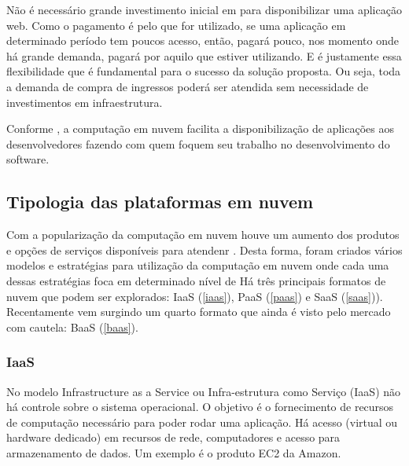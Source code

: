 Não é necessário grande investimento inicial em para disponibilizar uma aplicação web.
Como o pagamento é pelo que for utilizado, se uma aplicação em determinado período tem
poucos acesso, então, pagará pouco, nos momento onde há grande demanda, pagará por aquilo
que estiver utilizando. E é justamente essa flexibilidade que é fundamental para o sucesso
da solução proposta. Ou seja, toda a demanda de compra de ingressos poderá ser atendida
sem necessidade de investimentos em infraestrutura.

Conforme \cite{types-of-cloud-computing}, a computação em nuvem facilita a disponibilização
de aplicações aos desenvolvedores fazendo com quem foquem seu trabalho no desenvolvimento
do software.


\subsection{Tipologia das plataformas em nuvem}\label{tipologia-das-plataformas-em-nuvem}

Com a popularização da computação em nuvem houve um aumento dos produtos e opções de
serviços disponíveis para atendenr .
Desta forma, foram criados vários modelos e estratégias para
utilização da computação em nuvem onde cada uma dessas estratégias foca em determinado
nível de
Há três principais formatos de nuvem que podem ser explorados:
IaaS (\autoref{iaas}), PaaS (\autoref{paas}) e SaaS (\autoref{saas})).
Recentamente vem surgindo um quarto formato que ainda é visto pelo mercado com
cautela: BaaS (\autoref{baas}).




\subsubsection{IaaS}\label{iaas}

No modelo Infrastructure as a Service ou Infra-estrutura como Serviço (IaaS)
não há controle sobre o sistema operacional. O objetivo é o fornecimento
de recursos de computação necessário para poder rodar uma aplicação. Há acesso (virtual
ou hardware dedicado) em recursos de rede, computadores e acesso para armazenamento
de dados.
Um exemplo é o produto EC2 da Amazon.

